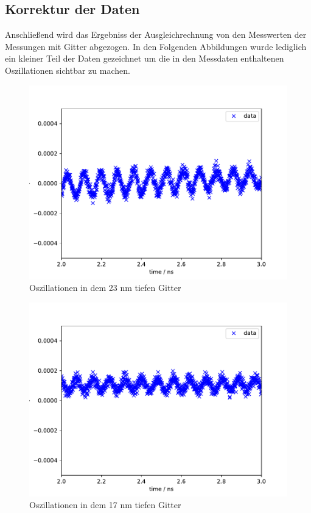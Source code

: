 \subsection{Korrektur der Daten}
Anschließend wird das Ergebniss der Ausgleichrechnung von den Messwerten der Messungen mit Gitter abgezogen.
In den Folgenden Abbildungen wurde lediglich ein kleiner Teil der Daten gezeichnet um die in den Messdaten enthaltenen 
Oszillationen sichtbar zu machen.

\begin{figure}[h!]
 	\centering
 	\includegraphics[width=\textwidth]{img/005_a000_b0_e245_G4corr.pdf}
 	\caption{Oszillationen in dem 23 nm tiefen Gitter}
 	\label{abb:film}
\end{figure}

\begin{figure}[h!]
 	\centering
 	\includegraphics[width=\textwidth]{img/006_a000_b0_e245_G3corr.pdf}
 	\caption{Oszillationen in dem 17 nm tiefen Gitter}
 	\label{abb:film}
\end{figure}

